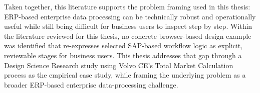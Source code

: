 Taken together, this literature supports the problem framing used in this thesis: ERP-based enterprise data processing can be technically robust and operationally useful while still being difficult for business users to inspect step by step. Within the literature reviewed for this thesis, no concrete browser-based design example was identified that re-expresses selected SAP-based workflow logic as explicit, reviewable stages for business users. This thesis addresses that gap through a Design Science Research study using Volvo CE's Total Market Calculation process as the empirical case study, while framing the underlying problem as a broader ERP-based enterprise data-processing challenge.

























